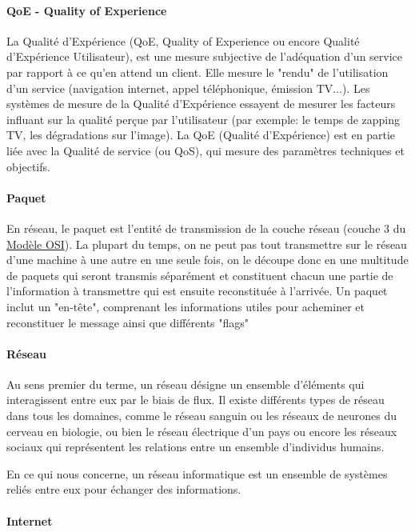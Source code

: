 \documentclass[french]{article}
\begin{document}
\paragraph{QoE - Quality of Experience}

La Qualité d'Expérience (QoE, Quality of Experience ou encore Qualité d'Expérience Utilisateur), est une mesure subjective de l'adéquation d'un service par rapport à ce qu'en attend un client. Elle mesure le "rendu" de l'utilisation d'un service (navigation internet, appel téléphonique, émission TV...). Les systèmes de mesure de la Qualité d'Expérience essayent de mesurer les facteurs influant sur la qualité perçue par l'utilisateur (par exemple: le temps de zapping TV, les dégradations sur l'image).
La QoE (Qualité d'Expérience) est en partie liée avec la Qualité de service (ou QoS), qui mesure des paramètres techniques et objectifs.

\paragraph{Paquet}

En réseau, le paquet est l'entité de transmission de la couche réseau (couche 3 du \hyperlink{modele_osi}{Modèle OSI}).
La plupart du temps, on ne peut pas tout transmettre sur le réseau d'une machine à une autre en une seule fois, on le découpe donc en une multitude de paquets qui seront transmis séparément et constituent chacun une partie de l'information à transmettre qui est ensuite reconstituée à l'arrivée.
Un paquet inclut un "en-tête", comprenant les informations utiles pour acheminer et reconstituer le message ainsi que différents "flags" 

\paragraph{Réseau}

Au sens premier du terme, un réseau désigne un ensemble d'éléments qui interagissent entre eux par le biais de flux.
Il existe différents types de réseau dans tous les domaines, comme le réseau sanguin ou les réseaux de neurones du cerveau en biologie, ou bien le réseau électrique d'un pays ou encore les réseaux sociaux qui représentent les relations entre un ensemble d'individus humains.

En ce qui nous concerne, un réseau informatique est un ensemble de systèmes reliés entre eux pour échanger des informations.

\paragraph{Internet}
\end{document}

